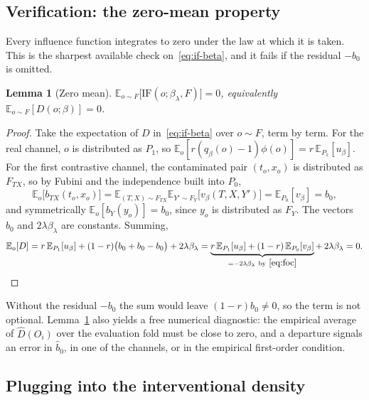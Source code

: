 \documentclass[11pt]{article}
\newtheorem{lemma}{Lemma}
\newcommand{\Eb}{\mathbb{E}}
\newcommand{\IF}{\mathrm{IF}}
\begin{document}
\subsection{Verification: the zero-mean property}
\label{sec:check}

Every influence function integrates to zero under the law at which it is taken. This
is the sharpest available check on~\eqref{eq:if-beta}, and it fails if the residual
$-b_0$ is omitted.

\begin{lemma}[Zero mean]
\label{lem:zero-mean}
$\Eb_{o\sim F}\big[\IF(o;\beta_\lambda,F)\big]=0$, equivalently
$\Eb_{o\sim F}[D(o;\beta)]=0$.
\end{lemma}

\begin{proof}
Take the expectation of $D$ in~\eqref{eq:if-beta} over $o\sim F$, term by term. For the
real channel, $o$ is distributed as $P_1$, so
$\Eb_o[r(q_\beta(o)-1)\phi(o)]=r\,\Eb_{P_1}[u_\beta]$. For the first contrastive
channel, the contaminated pair $(t_o,x_o)$ is distributed as $F_{TX}$, so by Fubini and
the independence built into $P_0$,
\[
\Eb_o\big[b_{TX}(t_o,x_o)\big]
= \Eb_{(T,X)\sim F_{TX}}\Eb_{Y'\sim F_Y}\big[v_\beta(T,X,Y')\big]
= \Eb_{P_0}[v_\beta] = b_0,
\]
and symmetrically $\Eb_o[b_Y(y_o)]=b_0$, since $y_o$ is distributed as $F_Y$. The
vectors $b_0$ and $2\lambda\beta_\lambda$ are constants. Summing,
\[
\Eb_o[D] = r\,\Eb_{P_1}[u_\beta] + (1-r)\big(b_0+b_0-b_0\big) + 2\lambda\beta_\lambda
= \underbrace{r\,\Eb_{P_1}[u_\beta]+(1-r)\,\Eb_{P_0}[v_\beta]}_{=-2\lambda\beta_\lambda\ \text{by}~\eqref{eq:foc}}
+\,2\lambda\beta_\lambda = 0. \qedhere
\]
\end{proof}

Without the residual $-b_0$ the sum would leave $(1-r)b_0\neq0$, so the term is not
optional. Lemma~\ref{lem:zero-mean} also yields a free numerical diagnostic: the
empirical average of $\widehat D(O_i)$ over the evaluation fold must be close to zero,
and a departure signals an error in $\hat b_0$, in one of the channels, or in the
empirical first-order condition.

\subsection{Plugging into the interventional density}
\label{sec:plug}
\end{document}
